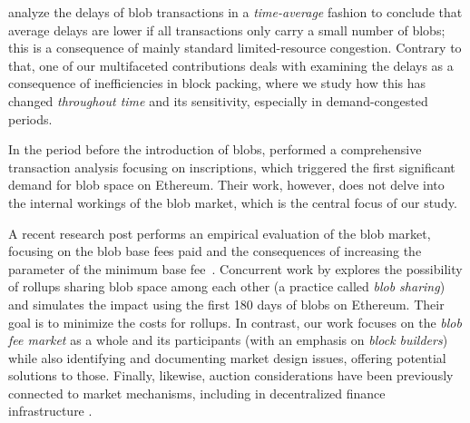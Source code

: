 \textcite{soltani2024delay} analyze the delays of blob transactions in a \emph{time-average} fashion to conclude that average delays are lower if all transactions only carry a small number of blobs; this is a consequence of mainly standard limited-resource congestion. Contrary to that, one of our multifaceted contributions deals with examining the delays as a consequence of inefficiencies in block packing, where we study how this has changed \emph{throughout time} and its sensitivity, especially in demand-congested periods.

In the period before the introduction of blobs, \textcite{messias2024writing} performed a comprehensive transaction analysis focusing on inscriptions, which triggered the first significant demand for blob space on Ethereum. Their work, however, does not delve into the internal workings of the blob market, which is the central focus of our study.

A recent research post performs an empirical evaluation of the blob market, focusing on the blob base fees paid and the consequences of increasing the parameter of the minimum base fee~\parencite{dataalways2024minimumblobfees}. Concurrent work by \textcite{lee2024180} explores the possibility of rollups sharing blob space among each other (a practice called \textit{blob sharing}) and simulates the impact using the first 180 days of blobs on Ethereum. Their goal is to minimize the costs for rollups. In contrast, our work focuses on the \emph{blob fee market} as a whole and its participants (with an emphasis on \emph{block builders}) while also identifying and documenting market design issues, offering potential solutions to those.
Finally, likewise, auction considerations have been previously connected to market mechanisms, including in decentralized finance infrastructure \parencite{myersonian_mm,complexity,nftauctions}.


